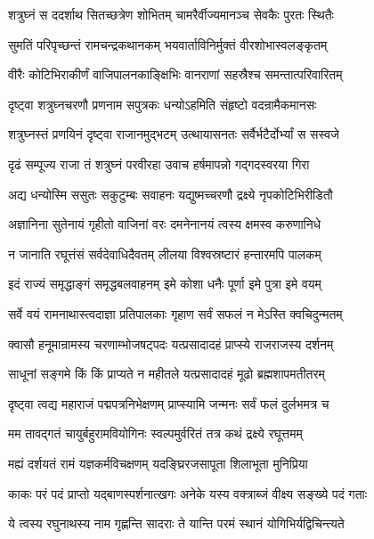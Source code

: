 \twolineshloka
{शत्रुघ्नं स ददर्शाथ सितच्छत्रेण शोभितम्}
{चामरैर्वीज्यमानञ्च सेवकैः पुरतः स्थितैः}%

\twolineshloka
{सुमतिं परिपृच्छन्तं रामचन्द्रकथानकम्}
{भयवार्ताविनिर्मुक्तं वीरशोभास्वलङ्कृतम्}%

\twolineshloka
{वीरैः कोटिभिराकीर्णं वाजिपालनकाङ्क्षिभिः}
{वानराणां सहस्रैश्च समन्तात्परिवारितम्}%

\twolineshloka
{दृष्ट्वा शत्रुघ्नचरणौ प्रणनाम सपुत्रकः}
{धन्योऽहमिति संहृष्टो वदन्रामैकमानसः}%

\twolineshloka
{शत्रुघ्नस्तं प्रणयिनं दृष्ट्वा राजानमुद्भटम्}
{उत्थायासनतः सर्वैर्भटैर्दोर्भ्यां स सस्वजे}%

\twolineshloka
{दृढं सम्पूज्य राजा तं शत्रुघ्नं परवीरहा}
{उवाच हर्षमापन्नो गद्गदस्वरया गिरा}%


\twolineshloka
{अद्य धन्योस्मि ससुतः सकुटुम्बः सवाहनः}
{यद्युष्मच्चरणौ द्रक्ष्ये नृपकोटिभिरीडितौ}%

\twolineshloka
{अज्ञानिना सुतेनायं गृहीतो वाजिनां वरः}
{दमनेनानयं त्वस्य क्षमस्व करुणानिधे}%

\twolineshloka
{न जानाति रघूत्तंसं सर्वदेवाधिदैवतम्}
{लीलया विश्वस्रष्टारं हन्तारमपि पालकम्}%

\twolineshloka
{इदं राज्यं समृद्धाङ्गं समृद्धबलवाहनम्}
{इमे कोशा धनैः पूर्णा इमे पुत्रा इमे वयम्}%

\twolineshloka
{सर्वे वयं रामनाथास्त्वदाज्ञा प्रतिपालकाः}
{गृहाण सर्वं सफलं न मेऽस्ति क्वचिदुन्मतम्}%

\twolineshloka
{क्वासौ हनूमान्रामस्य चरणाम्भोजषट्पदः}
{यत्प्रसादादहं प्राप्स्ये राजराजस्य दर्शनम्}%

\twolineshloka
{साधूनां सङ्गमे किं किं प्राप्यते न महीतले}
{यत्प्रसादादहं मूढो ब्रह्मशापमतीतरम्}%

\twolineshloka
{दृष्ट्वा त्वद्य महाराजं पद्मपत्रनिभेक्षणम्}
{प्राप्स्यामि जन्मनः सर्वं फलं दुर्लभमत्र च}%

\twolineshloka
{मम तावद्गतं चायुर्बहुरामवियोगिनः}
{स्वल्पमुर्वरितं तत्र कथं द्रक्ष्ये रघूत्तमम्}%

\twolineshloka
{मह्यं दर्शयतं रामं यज्ञकर्मविचक्षणम्}
{यदङ्घ्रिरजसापूता शिलाभूता मुनिप्रिया}%

\twolineshloka
{काकः परं पदं प्राप्तो यद्बाणस्पर्शनात्खगः}
{अनेके यस्य वक्त्राब्जं वीक्ष्य सङ्ख्ये पदं गताः}%

\twolineshloka
{ये त्वस्य रघुनाथस्य नाम गृह्णन्ति सादराः}
{ते यान्ति परमं स्थानं योगिभिर्यद्विचिन्त्यते}%

